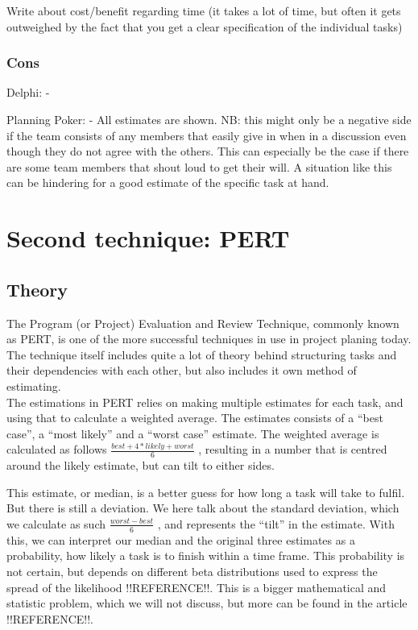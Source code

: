 Write about cost/benefit regarding time (it takes a lot of time, but often it gets outweighed by the fact that you get a clear specification of the individual tasks)


\subsubsection{Cons}

Delphi:
- 

Planning Poker:
- All estimates are shown. NB: this might only be a negative side if the team consists of any members that easily give in when in a discussion even though they do not agree with the others. This can especially be the case if there are some team members that shout loud to get their will. A situation like this can be hindering for a good estimate of the specific task at hand.

\section{Second technique: PERT}
\subsection{Theory}

The Program (or Project) Evaluation and Review Technique, commonly known as PERT, is one of the more successful techniques in use in project planing today. The technique itself includes quite a lot of theory behind structuring tasks and their dependencies with each other, but also includes it own method of estimating.\\

The estimations in PERT relies on making multiple estimates for each task, and using that to calculate a weighted average. The estimates consists of a ``best case'', a ``most likely'' and a ``worst case'' estimate. The weighted average is calculated as follows
$\frac{best+4*likely+worst}{6}$
, resulting in a number that is centred around the likely estimate, but can tilt to either sides.\
 
This estimate, or median, is a better guess for how long a task will take to fulfil. But there is still a deviation. We here talk about the standard deviation, which we calculate as such
$\frac{worst-best}{6}$
, and represents the ``tilt'' in the estimate. With this, we can interpret our median and the original three estimates as a probability, how likely a task is to finish within a time frame. This probability is not certain, but depends on different beta distributions used to express the spread of the likelihood !!REFERENCE!!. This is a bigger mathematical and statistic problem, which we will not discuss, but more can be found in the article !!REFERENCE!!.\

